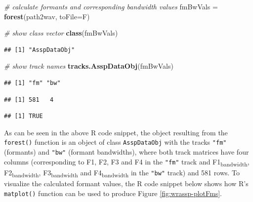 \documentclass[]{book}
\newenvironment{Shaded}{\begin{snugshade}}{\end{snugshade}}
\newcommand{\CommentTok}[1]{\textcolor[rgb]{0.56,0.35,0.01}{\textit{#1}}}
\newcommand{\DataTypeTok}[1]{\textcolor[rgb]{0.13,0.29,0.53}{#1}}
\newcommand{\KeywordTok}[1]{\textcolor[rgb]{0.13,0.29,0.53}{\textbf{#1}}}
\newcommand{\NormalTok}[1]{#1}
\newcommand{\OperatorTok}[1]{\textcolor[rgb]{0.81,0.36,0.00}{\textbf{#1}}}
\newcommand{\StringTok}[1]{\textcolor[rgb]{0.31,0.60,0.02}{#1}}
\theoremstyle{definition}
\theoremstyle{definition}
\theoremstyle{definition}
\theoremstyle{remark}
\begin{document}
\begin{Shaded}
\begin{Highlighting}[]
\CommentTok{# calculate formants and corresponding bandwidth values}
\NormalTok{fmBwVals =}\StringTok{ }\KeywordTok{forest}\NormalTok{(path2wav, }\DataTypeTok{toFile=}\NormalTok{F)}

\CommentTok{# show class vector}
\KeywordTok{class}\NormalTok{(fmBwVals)}
\end{Highlighting}
\end{Shaded}

\begin{verbatim}
## [1] "AsspDataObj"
\end{verbatim}

\begin{Shaded}
\begin{Highlighting}[]
\CommentTok{# show track names}
\KeywordTok{tracks.AsspDataObj}\NormalTok{(fmBwVals)}
\end{Highlighting}
\end{Shaded}

\begin{verbatim}
## [1] "fm" "bw"
\end{verbatim}

\begin{Shaded}
\end{Shaded}

\begin{verbatim}
## [1] 581   4
\end{verbatim}

\begin{Shaded}
\end{Shaded}

\begin{verbatim}
## [1] TRUE
\end{verbatim}

As can be seen in the above R code snippet, the object resulting from
the \texttt{forest()} function is an object of class
\texttt{AsspDataObj} with the tracks \texttt{"fm"} (formants) and
\texttt{"bw"} (formant bandwidths), where both track matrices have four
columns (corresponding to F1, F2, F3 and F4 in the \texttt{"fm"} track
and F1\textsubscript{bandwidth}, F2\textsubscript{bandwidth},
F3\textsubscript{bandwidth} and F4\textsubscript{bandwidth} in the
\texttt{"bw"} track) and 581 rows. To visualize the calculated formant
values, the R code snippet below shows how R's \texttt{matplot()}
function can be used to produce Figure \ref{fig:wrassp-plotFms}.
\end{document}
